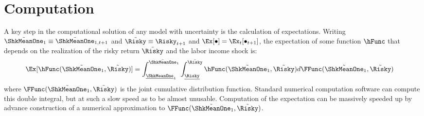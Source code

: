 \documentclass{handout}
\begin{document}

\section{Computation}

A key step in the computational solution of any model with uncertainty is the calculation 
of expectations.  Writing $\tilde{\ShkMeanOne}_{1} \equiv \tilde{\ShkMeanOne}_{1,t+1}$ and $\tilde{\Risky} \equiv \Risky_{t+1}$ and $\Ex[\bullet] = \Ex_{t}[\bullet_{t+1}]$, the expectation of some function $\hFunc$ that depends on the realization of
the risky return $\tilde{\Risky}$ and the labor income shock is:
\begin{equation}\begin{gathered}\begin{aligned}
  \Ex[\hFunc(\tilde{\ShkMeanOne}_{1},\tilde{\Risky})] & =  \int_{\underline{\ShkMeanOne}_{1}}^{\bar{\ShkMeanOne}_{1}}\int_{\underline{\Risky}}^{\bar{\Risky}} \hFunc(\tilde{\ShkMeanOne}_{1},\tilde{\Risky}) d\FFunc(\tilde{\ShkMeanOne}_{1},\tilde{\Risky})
\end{aligned}\end{gathered}\end{equation}
where $\FFunc(\tilde{\ShkMeanOne}_{1},\tilde{\Risky})$ is the joint cumulative distribution
function.  Standard numerical computation software can compute this
double integral, but at such a slow speed as to be almost unusable.
Computation of the expectation can be massively speeded up by
advance construction of a numerical approximation to
$\FFunc(\tilde{\ShkMeanOne}_{1},\tilde{\Risky})$.
\end{document}
